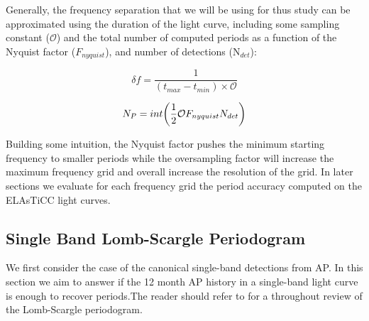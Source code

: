 \documentclass[DM,authoryear,toc]{lsstdoc}
\begin{document}
Generally, the frequency separation that we will be using for thus study can be approximated using the duration of the light curve, including some sampling constant ($\mathcal{O}$) and the total number of computed periods as a function of the Nyquist factor ($F_{nyquist}$), and number of detections (N$_{det}$):

\begin{equation}
\delta f = \frac{1}{(t_{max} - t_{min}) \times \mathcal{O}}
\end{equation}

\begin{equation}
N_{P} = int \bigg{(} \frac{1}{2} \mathcal{O} F_{nyquist} N_{det} \bigg{)}
\end{equation}

Building some intuition, the Nyquist factor pushes the minimum starting frequency to smaller periods while the oversampling factor will increase the maximum frequency grid and overall increase the resolution of the grid. In later sections we evaluate for each frequency grid the period accuracy computed on the ELAsTiCC light curves.

\subsection{Single Band Lomb-Scargle Periodogram}
We first consider the case of the canonical single-band detections from AP. In this section we aim to answer if the 12 month AP history in a single-band light curve is enough to recover periods.The reader should refer to \citet{VanderPlas:VP2015} for a throughout review of the Lomb-Scargle periodogram.
\end{document}
